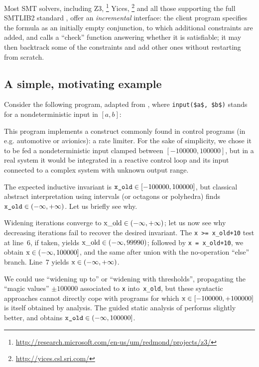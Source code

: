 \documentclass[preprint]{sigplanconf}
\begin{document}
Most SMT solvers, including Z3,%
\footnote{\url{http://research.microsoft.com/en-us/um/redmond/projects/z3/}}
Yices,%
\footnote{\url{http://yices.csl.sri.com/}}
and all those supporting the full SMTLIB2 standard \cite{BarST-SMTLIB},
offer an \emph{incremental} interface: the client program specifies the formula as an initially empty conjunction, to which additional constraints are added, and calls a ``check'' function answering whether it is satisfiable; 
it may then backtrack some of the constraints and add other ones without restarting from scratch.

\subsection{A simple, motivating example}
\label{subsec:rate_lim}
Consider the following program, adapted from \cite{Monniaux_Gonnord_SAS11}, where \lstinline|input($a$, $b$)| stands for a nondeterministic input in $[a,b]$:

This program implements a construct commonly found in control programs (in e.g. automotive or avionics): a rate limiter. For the sake of simplicity, we chose it to be fed a nondeterministic input clamped between $[-100000,100000]$, but in a real system it would be integrated in a reactive control loop and its input connected to a complex system with unknown output range.

The expected inductive invariant is $\verb|x_old| \in [-100000,100000]$, but classical abstract interpretation using intervals (or octagons or polyhedra) finds $\verb|x_old| \in (-\infty,+\infty)$. %
Let us briefly see why.

Widening iterations converge to $\lstinline|x_old| \in (-\infty,+\infty)$; let us now see why decreasing iterations fail to recover the desired invariant. %
The \lstinline|x >= x_old+10| test at line~6, if taken, yields $\lstinline|x_old| \in (-\infty,99990)$; followed by \lstinline|x = x_old+10|, we obtain $\lstinline|x| \in (-\infty,\allowbreak 100000]$, and the same after union with the no-operation ``else'' branch. Line~7 yields $\lstinline|x| \in (-\infty,+\infty)$.

We could use ``widening up to'' or ``widening with thresholds'', propagating the ``magic values'' $\pm 100000$ associated to \lstinline|x| into~\lstinline|x_old|, but these syntactic approaches cannot directly cope with programs for which $\lstinline|x|  \in [-100000,+100000]$ is itself obtained by analysis.
The guided static analysis of \citet{DBLP:conf/sas/GopanR07} performs slightly better, and obtains $\verb|x_old| \in (-\infty,100000]$.
\end{document}
